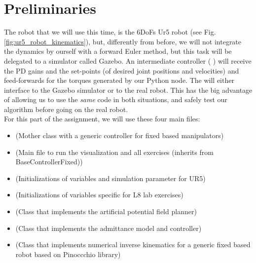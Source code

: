 \documentclass[11pt]{article}
\begin{document}
\section{Preliminaries}
	The robot that we will use this time, is the  6DoFs Ur5 robot (see Fig. \ref{fig:ur5_robot_kinematics}), but, differently from before, we will not integrate the dynamics by ourself with a forward Euler method,  but this task will be delegated to a simulator called Gazebo. An intermediate controller ( ) will receive the PD gains and the set-points (of desired joint positions and velocities) and feed-forwards for the torques generated by our Python node.
	The   will either interface to the  Gazebo simulator or to the real robot. This has the big advantage of  allowing us to use the \textit{same} code in both situations, and safely test our algorithm before going on the real robot.\\
	
	
	For this part of the assignment, we will use these four main files: 
	\begin{itemize}
		\item {} (Mother class with a generic controller for fixed based manipulators)
		\item {} (Main file to run the visualization and all exercises (inherits from BaseControllerFixed))
		\item {} (Initializations of variables and simulation parameter for UR5)
		\item {} (Initializations of variables specific for L8 lab exercises)
			\item {} (Class that implements the artificial potential field planner)
				\item {} (Class that implements the admittance model and controller)
					\item {} (Class that implements numerical inverse kinematics for a generic fixed based robot based on Pinoccchio library)
	\end{itemize}
	
\end{document}
